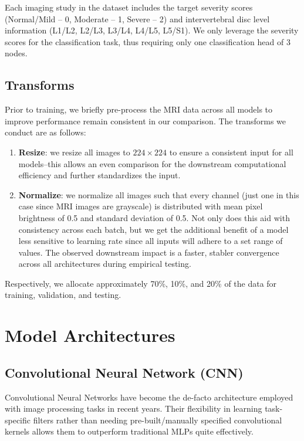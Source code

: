\documentclass[conference]{IEEEtran}
\begin{document}
Each imaging study in the dataset includes the target severity scores (Normal/Mild -- 0, Moderate -- 1, Severe -- 2) and intervertebral disc level information (L1/L2, L2/L3, L3/L4, L4/L5, L5/S1). We only leverage the severity scores for the classification task, thus requiring only one classification head of 3 nodes.

\subsection{Transforms}
Prior to training, we briefly pre-process the MRI data across all models to improve performance remain consistent in our comparison. The transforms we conduct are as follows:
\begin{enumerate}
    \item \textbf{Resize}: we resize all images to $224 \times 224$ to ensure a consistent input for all models--this allows an even comparison for the downstream computational efficiency and further standardizes the input.

    \item \textbf{Normalize}: we normalize all images such that every channel (just one in this case since MRI images are grayscale) is distributed with mean pixel brightness of 0.5 and standard deviation of 0.5. Not only does this aid with consistency across each batch, but we get the additional benefit of a model less sensitive to learning rate since all inputs will adhere to a set range of values. The observed downstream impact is a faster, stabler convergence across all architectures during empirical testing.
\end{enumerate}

Respectively, we allocate approximately 70\%, 10\%, and 20\% of the data for training, validation, and testing.


\section{Model Architectures}
\subsection{Convolutional Neural Network (CNN)} \label{sec:CNN}
Convolutional Neural Networks have become the de-facto architecture employed with image processing tasks in recent years. Their flexibility in learning task-specific filters rather than needing pre-built/manually specified convolutional kernels allows them to outperform traditional MLPs quite effectively.
\end{document}
